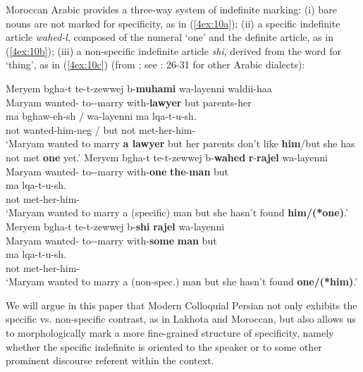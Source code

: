 \documentclass[output=paper]{langsci/langscibook}
\begin{document}
Moroccan Arabic provides a three-way system of indefinite marking: (i) bare nouns are not marked for specificity, as in (\ref{4ex:10a}); (ii) a specific indefinite article {\emph{wahed-l}}, composed of the numeral `one' and the definite article, as in (\ref{4ex:10b}); (iii) a non-specific indefinite article {\emph{shi}}, derived from the word for `thing', as in (\ref{4ex:10c}) (from \citealt{fassifehri:06}; see \citealt{brustad:00}: 26-31 for other Arabic dialects):

\begin{exe}
\ex\label{4ex:10}
	\begin{xlista}
	\ex\label{4ex:10a}
	\gll	Meryem  	bgha-t     		te-t-zewwej		b-{\bf{muhami}}		wa-layenni 	waldii-haa   \\
		Maryam 	wanted-{}  	to-{}-marry		with-{\bf{lawyer}}	but         		parents-her  \\
	\glt
	\exi{}
 	\gll	ma bghaw-eh-sh          /  	wa-layenni  	ma  	lqa-t-u-sh.  \\
      		not wanted-him-neg    /	but        		not 	met-her-him-{} \\
	\glt	`Maryam wanted to marry {\bf{a lawyer}} but her parents don't like {\bf{him}}/but she has not met {\bf{one}} yet.'
	\ex\label{4ex:10b}
	\gll	Meryem  bgha-t       te-t-zewwej b-{\bf{wahed}} {\bf{r}}-{\bf{rajel}}    	wa-layenni  \\
      		Maryam wanted-{}   to-{}-marry   with-{\bf{one}} {\bf{the}}-{\bf{man}} 	but  \\
	\glt
	\exi{}
	\gll	ma  	lqa-t-u-sh. \\
		not 	met-her-him-{} \\
	\glt	`Maryam wanted to marry a (specific) man but she hasn't found {\bf{him/(*one)}}.'
	\ex\label{4ex:10c}
	\gll	Meryem	bgha-t		te-t-zewwej		b-{\bf{shi}}           	{\bf{rajel}}   wa-layenni   \\
      		Maryam	wanted-{}	to-{}-marry  	with-{\bf{some}}  	{\bf{man}}    but  \\
	\glt
	\exi{}
	\gll	ma lqa-t-u-sh. \\
		not  met-her-him-{} \\
	\glt	`Maryam wanted to marry a (non-spec.) man but she hasn't found {\bf{one/(*him)}}.'
	\end{xlista}
\end{exe}

We will argue in this paper that Modern Colloquial Persian not only exhibits the specific vs. non-specific contrast, as in Lakhota and Moroccan, but also allows us to morphologically mark a more fine-grained structure of specificity, namely whether the specific indefinite is oriented to the speaker or to some other prominent discourse referent within the context.
\end{document}
